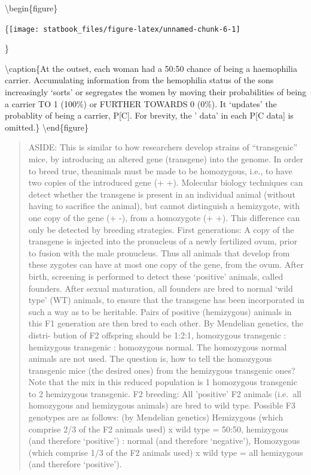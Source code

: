 \documentclass[]{book}
\begin{document}
\textbackslash{}begin\{figure\}

\{\centering \texttt{[image: statbook\_files/figure-latex/unnamed-chunk-6-1]}

\}

\textbackslash{}caption\{At the outset, each woman had a 50:50 chance of being a haemophilia carrier. Accumulating information from the hemophilia status of the sons increasingly `sorts' or segregates the women by moving their probabilities of being a carrier TO 1 (100\%) or FURTHER TOWARDS 0 (0\%). It `updates' the probablity of being a carrier, P{[}C{]}. For brevity, the ' \textbar{} data' in each P{[}C \textbar{} data{]} is omitted.\}\label{fig:unnamed-chunk-6}
\textbackslash{}end\{figure\}

\begin{quote}
ASIDE: This is similar to how researchers develop strains of ``transgenic'' mice, by introducing an altered gene (transgene) into the genome. In order to breed true, theanimals must be made to be homozygous, i.e., to have two copies of the introduced gene (+ +). Molecular biology techniques can detect whether the transgene is present in an individual animal (without having to sacrifice the animal), but cannot distinguish a hemizygote, with one copy of the gene (+ -), from a homozygote (+ +). This difference can only be detected by breeding strategies. First generations: A copy of the transgene is injected into the pronucleus of a newly fertilized ovum, prior to fusion with the male pronucleus. Thus all animals that develop from these zygotes can have at most one copy of the gene, from the ovum. After birth, screening is performed to detect these `positive' animals, called founders. After sexual maturation, all founders are bred to normal `wild type' (WT) animals, to ensure that the transgene has been incorporated in such a way as to be heritable. Pairs of positive (hemizygous) animals in this F1 generation are then bred to each other. By Mendelian genetics, the distri- bution of F2 offspring should be 1:2:1, homozygous transgenic : hemizygous transgenic : homozygous normal. The homozygous normal animals are not used. The question is, how to tell the homozygous transgenic mice (the desired ones) from the hemizygous transgenic ones? Note that the mix in this reduced population is 1 homozygous transgenic to 2 hemizygous transgenic. F2 breeding: All 'positive' F2 animals (i.e.~all homozygous and hemizygous animals) are bred to wild type. Possible F3 genotypes are as follows: (by Mendelian genetics) Hemizygous (which comprise 2/3 of the F2 animals used) x wild type = 50:50, hemizygous (and therefore `positive') : normal (and therefore `negative'), Homozygous (which comprise 1/3 of the F2 animals used) x wild type = all hemizygous (and therefore `positive').

\end{quote}
\end{document}
